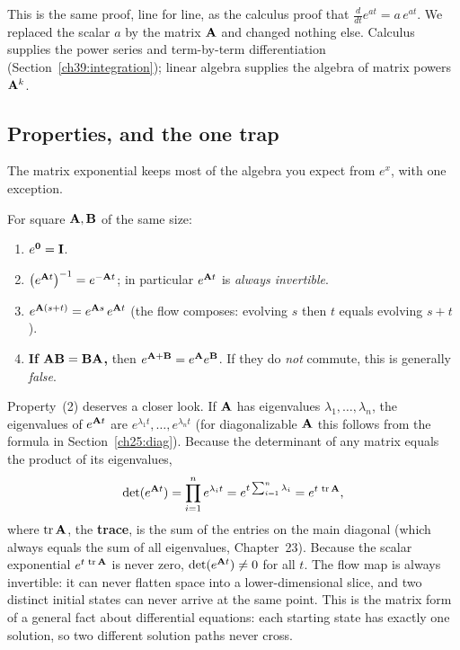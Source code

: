 \begin{connectionbox}
This is the same proof, line for line, as the calculus proof that
$\frac{d}{dt}e^{at} = a\,e^{at}$. We replaced the scalar $a$ by the
matrix $\mathbf{A}$ and changed nothing else.
Calculus supplies the power series and term-by-term differentiation
(Section~\ref{ch39:integration}); linear algebra supplies the algebra of
matrix powers $\mathbf{A}^k$.
\end{connectionbox}

\subsection{Properties, and the one trap}
\label{ch25:props}

The matrix exponential keeps most of the algebra you expect from $e^x$, with
one exception.

\begin{proposition}
\label{ch25:prop-algebra}
For square $\mathbf{A},\mathbf{B}$ of the same size:
\begin{enumerate}
  \item $e^{\mathbf{0}} = \mathbf{I}$.
  \item $\bigl(e^{\mathbf{A}t}\bigr)^{-1} = e^{-\mathbf{A}t}$; in particular
        $e^{\mathbf{A}t}$ is \emph{always invertible}.
  \item $e^{\mathbf{A}(s+t)} = e^{\mathbf{A}s}\,e^{\mathbf{A}t}$ (the flow composes:
        evolving $s$ then $t$ equals evolving $s+t$).
  \item \textbf{If $\mathbf{A}\mathbf{B}=\mathbf{B}\mathbf{A}$,} then
        $e^{\mathbf{A}+\mathbf{B}} = e^{\mathbf{A}}e^{\mathbf{B}}$.
        If they do \emph{not} commute, this is generally \emph{false}.
\end{enumerate}
\end{proposition}

Property~(2) deserves a closer look. If $\mathbf{A}$ has eigenvalues $\lambda_1,\dots,\lambda_n$,
the eigenvalues of $e^{\mathbf{A}t}$ are $e^{\lambda_1 t},\dots,e^{\lambda_n t}$
(for diagonalizable $\mathbf{A}$ this follows from the formula in
Section~\ref{ch25:diag}).
Because the determinant of any matrix equals the product of its eigenvalues,
\[
  \det(e^{\mathbf{A}t}) = \prod_{i=1}^n e^{\lambda_i t} = e^{t\sum_{i=1}^n \lambda_i} = e^{t\,\operatorname{tr}\mathbf{A}},
\]
where $\operatorname{tr}\mathbf{A}$, the \textbf{trace}, is the sum of the entries on the main
diagonal (which always equals the sum of all eigenvalues, Chapter~23). Because the scalar
exponential $e^{t\,\operatorname{tr}\mathbf{A}}$ is never zero, $\det(e^{\mathbf{A}t}) \neq 0$ for all
$t$. The flow map is always invertible: it can never flatten space into a
lower-dimensional slice, and two distinct initial states can never arrive at
the same point. This is the matrix form of a general fact about differential
equations: each starting state has exactly one solution, so two different
solution paths never cross.


